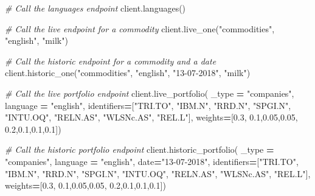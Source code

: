 \documentclass[]{book}
\newenvironment{Shaded}{\begin{snugshade}}{\end{snugshade}}
\newcommand{\FloatTok}[1]{\textcolor[rgb]{0.00,0.00,0.81}{#1}}
\newcommand{\StringTok}[1]{\textcolor[rgb]{0.31,0.60,0.02}{#1}}
\newcommand{\CommentTok}[1]{\textcolor[rgb]{0.56,0.35,0.01}{\textit{#1}}}
\newcommand{\OperatorTok}[1]{\textcolor[rgb]{0.81,0.36,0.00}{\textbf{#1}}}
\newcommand{\NormalTok}[1]{#1}
\theoremstyle{definition}
\theoremstyle{definition}
\theoremstyle{definition}
\theoremstyle{remark}
\begin{document}
\begin{Shaded}
\begin{Highlighting}[]
\CommentTok{# Call the languages endpoint}
\NormalTok{client.languages()}

\CommentTok{# Call the live endpoint for a commodity}
\NormalTok{client.live_one(}\StringTok{"commodities"}\NormalTok{, }\StringTok{"english"}\NormalTok{, }\StringTok{"milk"}\NormalTok{)}

\CommentTok{# Call the historic endpoint for a commodity and a date}
\NormalTok{client.historic_one(}\StringTok{"commodities"}\NormalTok{, }\StringTok{"english"}\NormalTok{, }\StringTok{"13-07-2018"}\NormalTok{, }\StringTok{"milk"}\NormalTok{)}

\CommentTok{# Call the live portfolio endpoint}
\NormalTok{client.live_portfolio( _type }\OperatorTok{=} \StringTok{"companies"}\NormalTok{, language }\OperatorTok{=} \StringTok{"english"}\NormalTok{, }
\NormalTok{                      identifiers}\OperatorTok{=}\NormalTok{[}\StringTok{"TRI.TO"}\NormalTok{, }\StringTok{"IBM.N"}\NormalTok{, }\StringTok{"RRD.N"}\NormalTok{, }\StringTok{"SPGI.N"}\NormalTok{, }\StringTok{"INTU.OQ"}\NormalTok{, }\StringTok{"RELN.AS"}\NormalTok{, }\StringTok{"WLSNc.AS"}\NormalTok{, }\StringTok{"REL.L"}\NormalTok{], }
\NormalTok{                      weights}\OperatorTok{=}\NormalTok{[}\FloatTok{0.3}\NormalTok{, }\FloatTok{0.1}\NormalTok{,}\FloatTok{0.05}\NormalTok{,}\FloatTok{0.05}\NormalTok{, }\FloatTok{0.2}\NormalTok{,}\FloatTok{0.1}\NormalTok{,}\FloatTok{0.1}\NormalTok{,}\FloatTok{0.1}\NormalTok{])}

\CommentTok{# Call the historic portfolio endpoint                    }
\NormalTok{client.historic_portfolio( _type }\OperatorTok{=} \StringTok{"companies"}\NormalTok{, language }\OperatorTok{=} \StringTok{"english"}\NormalTok{, date}\OperatorTok{=}\StringTok{"13-07-2018"}\NormalTok{, }
\NormalTok{                          identifiers}\OperatorTok{=}\NormalTok{[}\StringTok{"TRI.TO"}\NormalTok{, }\StringTok{"IBM.N"}\NormalTok{, }\StringTok{"RRD.N"}\NormalTok{, }\StringTok{"SPGI.N"}\NormalTok{, }\StringTok{"INTU.OQ"}\NormalTok{, }\StringTok{"RELN.AS"}\NormalTok{, }\StringTok{"WLSNc.AS"}\NormalTok{, }\StringTok{"REL.L"}\NormalTok{], }
\NormalTok{                          weights}\OperatorTok{=}\NormalTok{[}\FloatTok{0.3}\NormalTok{, }\FloatTok{0.1}\NormalTok{,}\FloatTok{0.05}\NormalTok{,}\FloatTok{0.05}\NormalTok{, }\FloatTok{0.2}\NormalTok{,}\FloatTok{0.1}\NormalTok{,}\FloatTok{0.1}\NormalTok{,}\FloatTok{0.1}\NormalTok{])}
\end{Highlighting}
\end{Shaded}
\end{document}
